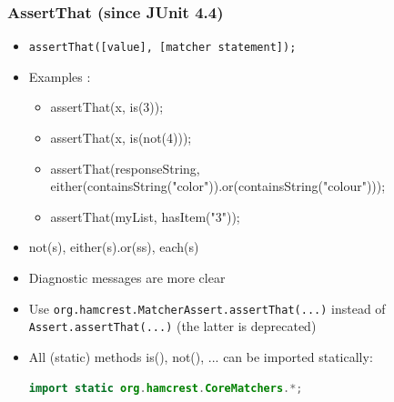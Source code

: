 \documentclass{beamer}
\begin{document}
\begin{frame}[fragile]
\frametitle{AssertThat (since JUnit 4.4)}
\begin{itemize}
  \item \texttt{assertThat([value], [matcher statement]);}
  \item Examples :
\begin{itemize}
  \item assertThat(x, is(3));
  \item assertThat(x, is(not(4)));
  \item assertThat(responseString, either(containsString("color")).or(containsString("colour")));
\item assertThat(myList, hasItem("3"));
\end{itemize}
  \item not(s), either(s).or(ss), each(s)
\item Diagnostic messages are more clear
\item Use \texttt{org.hamcrest.MatcherAssert.assertThat(...)} instead of
  \texttt{Assert.assertThat(...)} (the latter is deprecated)
\item All (static) methods is(), not(), ... can be imported statically:
\begin{lstlisting}[language=JAVA]
import static org.hamcrest.CoreMatchers.*;
\end{lstlisting}  
\end{itemize}
\end{frame}
\end{document}
